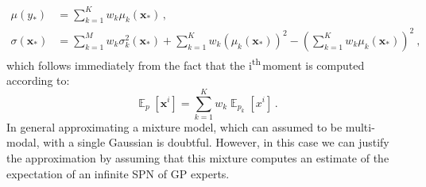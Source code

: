 \documentclass[10pt,letterpaper]{article}
\newcommand{\ths}{\textsuperscript{th}{\,}}
\DeclareMathOperator{\E}{\mathbb{E}}
\newcommand{\x}{\mathbf{x}}
\newcommand{\new}{_{*}}
\theoremstyle{mystyle}
\begin{document}
\begin{align}
  \mu(y\new) &= \sum_{k=1}^K w_k \mu_k(\x\new) \, , \\
  \sigma(\x\new) &= \sum_{k=1}^M w_k \sigma^2_k(\x\new) + \sum_{k=1}^K w_k (\mu_k(\x\new))^2 - \left(\sum_{k=1}^K w_k \mu_k(\x\new)\right)^2\ ,
\end{align}
which follows immediately from the fact that the i\ths moment is computed according to:
\[
  \E_{p}[\x^i] = \sum_{k=1}^K w_k \E_{p_k}[x^i] \, .
\]
In general approximating a mixture model, which can assumed to be multi-modal, with a single Gaussian is doubtful.
However, in this case we can justify the approximation by assuming that this mixture computes an estimate of the expectation of an infinite SPN of GP experts.

%
%
%
%
%
%
%    
%    
%
%            

\printbibliography
\end{document}
